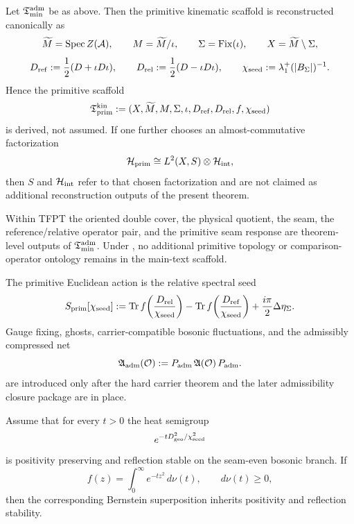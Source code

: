 \begin{theorem}
\label{thm:primitive-datum-from-reduced-datum}
\label{thm:primitive-scaffold-from-reduced-datum}
Let $\mathfrak T_{\mathrm{min}}^{\mathrm{adm}}$ be as above. Then the primitive kinematic scaffold is reconstructed
canonically as
\[
\widetilde M=\mathrm{Spec}\,Z(\mathcal A),\qquad
M=\widetilde M/\iota,\qquad
\Sigma=\mathrm{Fix}(\iota),\qquad
X=\widetilde M\setminus \Sigma,
\]
\[
D_{\mathrm{ref}}:=\frac12(D+\iota D\iota),\qquad
D_{\mathrm{rel}}:=\frac12(D-\iota D\iota),\qquad
\chi_{\mathrm{seed}}:=\lambda_1^+(|B_\Sigma|)^{-1}.
\]
Hence the primitive scaffold
\[
\mathfrak T_{\mathrm{prim}}^{\mathrm{kin}}
:=
(X,\widetilde M,M,\Sigma,\iota,D_{\mathrm{ref}},D_{\mathrm{rel}},f,\chi_{\mathrm{seed}})
\]
is derived, not assumed.
If one further chooses an almost-commutative factorization
\[
\mathcal H_{\mathrm{prim}}\cong L^2(X,S)\otimes \mathcal H_{\mathrm{int}},
\]
then $S$ and $\mathcal H_{\mathrm{int}}$ refer to that chosen factorization and are not claimed as
additional reconstruction outputs of the present theorem.
\end{theorem}

\begin{corollary}
Within TFPT the oriented double cover, the physical quotient, the seam, the
reference/relative operator pair, and the primitive seam response are theorem-level outputs of
$\mathfrak T_{\mathrm{min}}^{\mathrm{adm}}$. Under , no additional
primitive topology or comparison-operator ontology remains in the main-text scaffold.
\end{corollary}

\begin{definition}
The primitive Euclidean action is the relative spectral seed
\[
S_{\mathrm{prim}}[\chi_{\mathrm{seed}}]
:=
\operatorname{Tr} f\!\left(\frac{D_{\mathrm{rel}}}{\chi_{\mathrm{seed}}}\right)
-
\operatorname{Tr} f\!\left(\frac{D_{\mathrm{ref}}}{\chi_{\mathrm{seed}}}\right)
+\frac{i\pi}{2}\Delta\eta_\Sigma.
\]
Gauge fixing, ghosts, carrier-compatible bosonic fluctuations, and the admissibly compressed net
\[
\mathfrak A_{\mathrm{adm}}(\mathcal O):=
P_{\mathrm{adm}}\,\mathfrak A(\mathcal O)\,P_{\mathrm{adm}}.
\]
are introduced only after the hard carrier theorem and the later admissibility closure package are in place.
\end{definition}

\begin{theorem}
\label{ass:bernstein-positivity}
Assume that for every $t>0$ the heat semigroup
\[
e^{-tD_{\mathrm{geo}}^2/\chi_{\mathrm{seed}}^2}
\]
is positivity preserving and reflection stable on the seam-even bosonic branch.
If
\[
f(z)=\int_0^\infty e^{-tz^2}\,d\nu(t),\qquad d\nu(t)\ge 0,
\]
then the corresponding Bernstein superposition inherits positivity and reflection stability.
\end{theorem}

